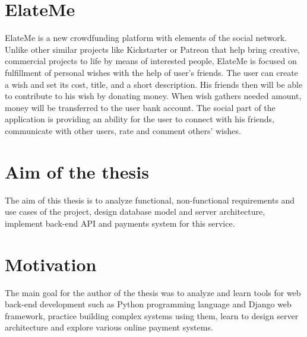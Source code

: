 \section{ElateMe}
ElateMe is a new crowdfunding platform with elements of the social network. Unlike other similar projects like
Kickstarter or Patreon that help bring creative, commercial projects to life by means of interested people, ElateMe
is focused on fulfillment of personal wishes with the help of user’s friends. The user can create a wish and set
its cost, title, and a short description. His friends then will be able to contribute to his wish by donating money.
When wish gathers needed amount, money will be transferred to the user bank account. The social part of the
application is providing an ability for the user to connect with his friends, communicate with other users,
rate and comment others’ wishes.

\section{Aim of the thesis}
The aim of this thesis is to analyze functional, non-functional requirements and use cases of the project, design
database model and server architecture, implement back-end \ac{API} and payments system for this service.

\section{Motivation}
The main goal for the author of the thesis was to analyze and learn tools for web back-end development such as Python
programming language and Django web framework, practice building complex systems using them, learn to design server
architecture and explore various online payment systems.
